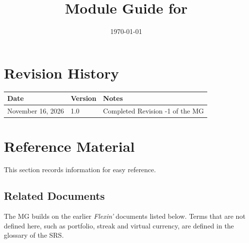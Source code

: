 \documentclass[12pt, titlepage]{article}
\begin{document}
\title{Module Guide for \progname{}} 
\author{\authname}
\date{\today}

\maketitle


\section{Revision History}

\begin{tabularx}{\textwidth}{p{3cm}p{2cm}X}
\toprule {\bf Date} & {\bf Version} & {\bf Notes}\\
\midrule
November 16, 2026 & 1.0 & Completed Revision -1 of the MG\\
\bottomrule
\end{tabularx}

\newpage

\section{Reference Material}

This section records information for easy reference.

\subsection{Related Documents}

The MG builds on the earlier \textit{Flexin'} documents listed below. Terms that
are not defined here, such as portfolio, streak and
virtual currency, are defined in the glossary of the SRS.
\end{document}

